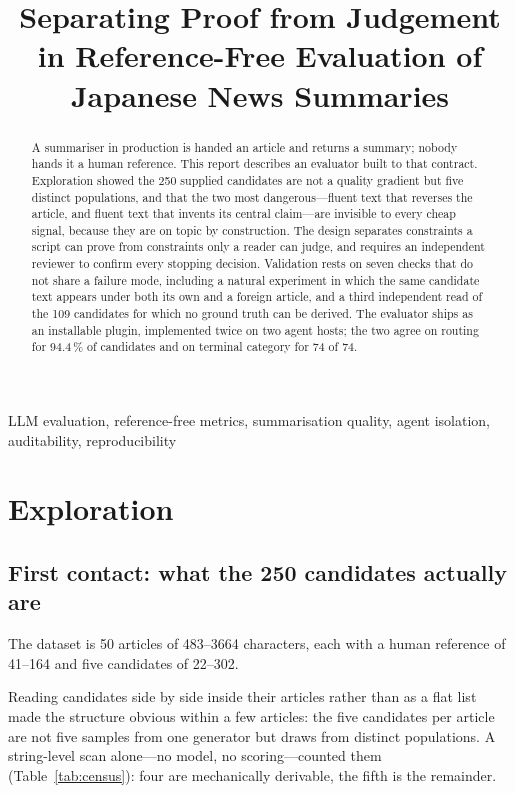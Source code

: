 \documentclass[conference]{IEEEtran}
\title{Separating Proof from Judgement in Reference-Free Evaluation of Japanese News Summaries}
\author{\IEEEauthorblockN{Chen Jinhua}
\IEEEauthorblockA{AI Quality Scientist Take-Home Assignment\\
50 XL-Sum Japanese articles, 250 candidate summaries}}
\begin{document}
\maketitle

\begin{abstract}
A summariser in production is handed an article and returns a summary; nobody hands it a human reference. This report describes an evaluator built to that contract. Exploration showed the 250 supplied candidates are not a quality gradient but five distinct populations, and that the two most dangerous---fluent text that reverses the article, and fluent text that invents its central claim---are invisible to every cheap signal, because they are on topic by construction. The design separates constraints a script can prove from constraints only a reader can judge, and requires an independent reviewer to confirm every stopping decision. Validation rests on seven checks that do not share a failure mode, including a natural experiment in which the same candidate text appears under both its own and a foreign article, and a third independent read of the 109 candidates for which no ground truth can be derived. The evaluator ships as an installable plugin, implemented twice on two agent hosts; the two agree on routing for 94.4\,\% of candidates and on terminal category for 74 of 74.
\end{abstract}

\begin{IEEEkeywords}
LLM evaluation, reference-free metrics, summarisation quality, agent isolation, auditability, reproducibility
\end{IEEEkeywords}

\section{Exploration}

\subsection{First contact: what the 250 candidates actually are}
The dataset is 50 articles of 483--3664 characters, each with a human
reference of 41--164 and five candidates of 22--302.

Reading candidates side by side inside their articles rather than as a flat
list made the structure obvious within a few articles: the five candidates
per article are not five samples from one generator but draws from distinct
populations. A string-level scan alone---no model, no scoring---counted them
(Table~\ref{tab:census}): four are mechanically derivable, the fifth is the
remainder.
\end{document}
